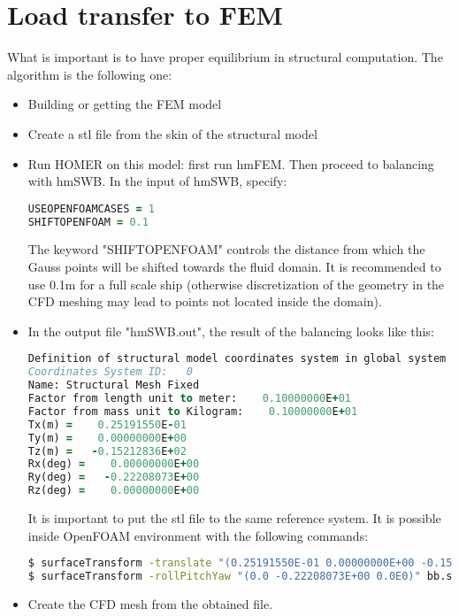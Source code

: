 \section{Load transfer to FEM}

What is important is to have proper equilibrium in structural computation. The algorithm is the following one:
\begin{itemize}
\item Building or getting the FEM model

\item Create a stl file from the skin of the structural model

\item Run HOMER on this model: first run hmFEM. Then proceed to balancing with hmSWB. In the input of hmSWB, specify:
\begin{lstlisting}[language=fortran]
USEOPENFOAMCASES = 1
SHIFTOPENFOAM = 0.1
\end{lstlisting}

The keyword "SHIFTOPENFOAM" controls the distance from which the Gauss points will be shifted towards the fluid domain. It is recommended to use 0.1m for a full scale ship (otherwise discretization of the geometry in the  CFD meshing may lead to points not located inside the domain).

\item In the output file "hmSWB.out", the result of the balancing looks like this:
\begin{lstlisting}[language=fortran]
Definition of structural model coordinates system in global system
Coordinates System ID:   0
Name: Structural Mesh Fixed
Factor from length unit to meter:    0.10000000E+01
Factor from mass unit to Kilogram:    0.10000000E+01
Tx(m) =    0.25191550E-01
Ty(m) =    0.00000000E+00
Tz(m) =   -0.15212836E+02
Rx(deg) =    0.00000000E+00
Ry(deg) =   -0.22208073E+00
Rz(deg) =    0.00000000E+00
\end{lstlisting}

It is important to put the stl file to the same reference system. It is possible inside OpenFOAM environment with the following commands:
\begin{lstlisting}[language=bash]
$ surfaceTransform -translate "(0.25191550E-01 0.00000000E+00 -0.15212836E+02)" aa.stl bb.stl
$ surfaceTransform -rollPitchYaw "(0.0 -0.22208073E+00 0.0E0)" bb.stl cc.stl
\end{lstlisting}

\item Create the CFD mesh from the obtained file.


\end{itemize}
